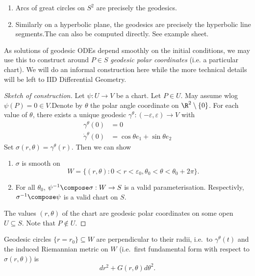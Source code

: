 \documentclass[a4paper]{article}
\theoremstyle{definition}
\begin{document}
\begin{eg}\leavevmode
  \begin{enumerate}
  \item Arcs of great circles on \(S^2\) are precisely the geodesics.
  \item Similarly on a hyperbolic plane, the geodesics are precisely the hyperbolic line segments.The can also be computed directly. See example sheet.
  \end{enumerate}
\end{eg}

As solutions of geodesic ODEs depend smoothly on the initial conditions, we may use this to construct around \(P \in S\) \emph{geodesic polar coordinates} (i.e. a particular chart). We will do an informal construction here while the more technical details will be left to IID Differential Geometry.

\begin{proof}[Sketch of construction]
  Let \(\psi: U \to V\) be a chart. Let \(P \in U\). May assume wlog \(\psi(P) = 0 \in V\).Denote by \(\theta\) the polar angle coordinate on \(\R^2 \setminus \{0\}\). For each value of \(\theta\), there exists a unique geodesic \(\gamma^\theta: (-\varepsilon, \varepsilon) \to V\) with
  \begin{align*}
    \gamma^\theta (0) &= 0 \\
    \dot \gamma^\theta(0) &= \cos \theta e_1 + \sin \theta e_2
  \end{align*}
  Set \(\sigma(r, \theta) = \gamma^\theta(r)\). Then we can show
  \begin{enumerate}
  \item \(\sigma\) is smooth on
    \[
      W = \{(r, \theta): 0 < r < \varepsilon_0, \theta_0 < \theta < \theta_0 + 2\pi\}.
    \]
  \item For all \(\theta_0\), \(\psi^{-1} \compose \sigma: W \to S\) is a valid parameterisation. Respectivly, \(\sigma^{-1} \compose \psi\) is a valid chart on \(S\).
  \end{enumerate}
  The values \((r, \theta)\) of the chart are geodesic polar coordinates on some open \(U \subseteq S\). Note that \(P \notin U\).
\end{proof}

\begin{theorem}
  Geodesic circles \(\{r = r_0\} \subseteq W\) are perpendicular to their radii, i.e.\ to \(\gamma^\theta(t)\) and the induced Riemannian metric on \(W\) (i.e.\ first fundamental form with respect to \(\sigma(r, \theta)\)) is
  \[
    dr^2 + G(r, \theta) d\theta^2.
  \]
\end{theorem}
\end{document}
